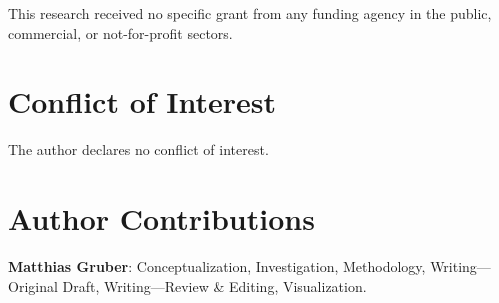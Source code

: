 \documentclass[12pt]{article}
\begin{document}
This research received no specific grant from any funding agency in the public, commercial, or not-for-profit sectors.


\section*{Conflict of Interest}

The author declares no conflict of interest.


\section*{Author Contributions}

\textbf{Matthias Gruber}: Conceptualization, Investigation, Methodology, Writing---Original Draft, Writing---Review \& Editing, Visualization.




\end{document}
